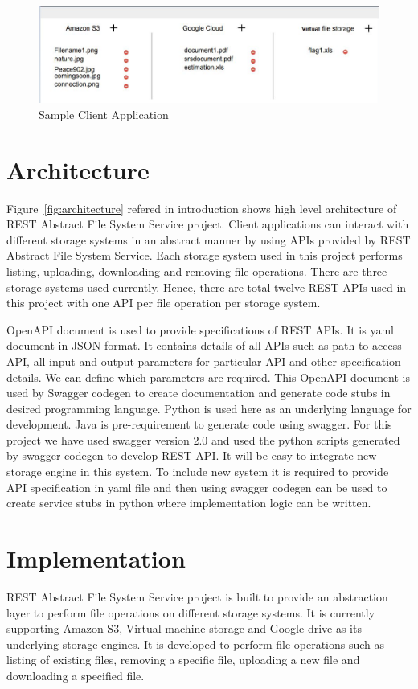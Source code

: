 \begin{figure}[!ht]
        \centering\includegraphics[width=\columnwidth]
        {image/client.JPG}
        \caption{Sample Client Application}\label{fig:client}
\end{figure}


\section{Architecture}

Figure~\ref{fig:architecture} refered in introduction shows high 
level architecture of REST Abstract File System Service project. 
Client applications can interact with different storage systems 
in an abstract manner by using APIs provided by REST Abstract 
File System Service. Each storage system used in this project 
performs listing, uploading, downloading and removing file 
operations. There are three storage systems used currently. 
Hence, there are total twelve REST APIs used in this project 
with one API per file operation per storage system. 


OpenAPI document is used to provide specifications of REST APIs.
It is yaml document in JSON format. 
It contains details of all APIs such as path 
to access API, all input and output parameters for particular API 
and other specification details. We can define which parameters are 
required.
This OpenAPI document is used by Swagger codegen to create documentation 
and generate code stubs in desired programming language. 
Python is used here as an underlying language for development.
Java is pre-requirement to generate code using swagger. For this 
project we have used swagger version 2.0 and used the python scripts 
generated by swagger codegen to develop REST API.
It will be easy to integrate new storage engine in this system. To include 
new system it is required to provide API specification in yaml file and 
then using swagger codegen can be used to create service stubs in python 
where implementation logic can be written. 


\section{Implementation}
REST Abstract File System Service project is built to provide 
an abstraction layer to perform file operations on different 
storage systems. It is currently supporting Amazon S3, 
Virtual machine storage and Google drive as its underlying 
storage engines.
It is developed to perform file operations such as listing of 
existing files, removing a specific file, uploading a new file 
and downloading a specified file.


